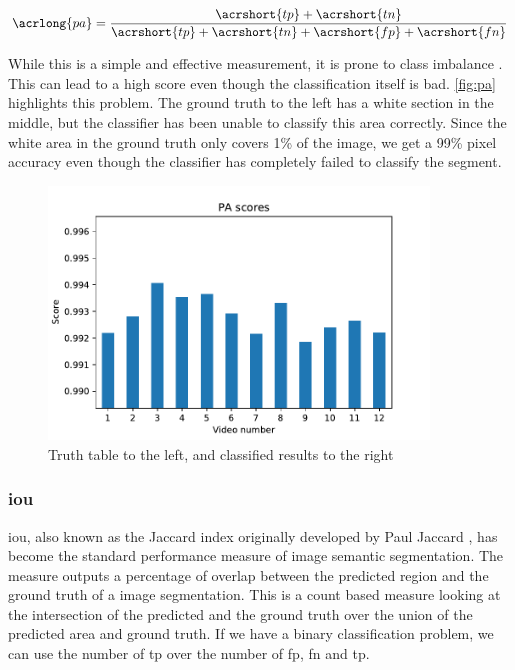 \begin{equation}
    \acrlong{pa} = \frac{\acrshort{tp}+\acrshort{tn}}{\acrshort{tp}+\acrshort{tn}+\acrshort{fp}+\acrshort{fn}}
\end{equation}

While this is a simple and effective measurement, it is prone to class imbalance \cite{tiu}. This can lead to a high score even though the classification itself is bad. \autoref{fig:pa} highlights this problem. The ground truth to the left has a white section in the middle, but the classifier has been unable to classify this area correctly. Since the white area in the ground truth only covers 1\% of the image, we get a 99\% pixel accuracy even though the classifier has completely failed to classify the segment.

\begin{figure}[H]
  \centering
  \includegraphics[width=0.9\textwidth]{img/objective_measures/pa.pdf}
  \caption{Truth table to the left, and classified results to the right}
  \label{fig:pa}
\end{figure}

\subsubsection{\acrlong{iou}}
\acrfull{iou}, also known as the Jaccard index originally developed by Paul Jaccard \cite{jaccard}, has become the standard performance measure of image semantic segmentation\cite{Rezatofighi_2019_CVPR}. The measure outputs a percentage of overlap between the predicted region and the ground truth of a image segmentation. This is a count based measure looking at the intersection of the predicted and the ground truth over the union of the predicted area and ground truth. If we have a binary classification problem, we can use the number of \acrlong{tp} over the number of \acrlong{fp}, \acrlong{fn} and \acrlong{tp}.
\cite{10.1007/978-3-319-50835-1_22}

